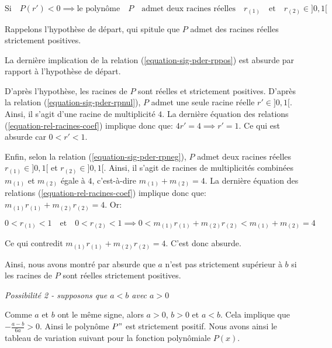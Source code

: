 \documentclass[12pt,a4paper,article]{memoir}
\begin{document}
\begin{equation}
\textrm{Si} \quad P(r') < 0 \implies \textrm{le polynôme} \quad P \quad \textrm{admet deux racines réelles} \quad r_{(1)} \quad \textrm{et} \quad r_{(2)} \in ]0,1[
\label{equation-sig-pder-rpneg}
\end{equation}

Rappelons l'hypothèse de départ, qui spitule que $P$ admet des racines réelles strictement positives. 

\bigskip

La dernière implication de la relation (\ref{equation-sig-pder-rppos}) est absurde par rapport à l'hypothèse de départ.

\bigskip

D'après l'hypothèse, les racines de $P$ sont réelles et strictement positives. D'après la relation (\ref{equation-sig-pder-rpnul}), $P$ admet une seule racine réelle $r' \in ]0,1[$. Ainsi, il s'agit d'une racine de multiplicité $4$. La dernière équation des relations (\ref{equation-rel-racines-coef}) implique donc que: $4r'=4 \implies r'=1$. Ce qui est absurde car  $0 < r' < 1$.

\bigskip

Enfin, selon la relation (\ref{equation-sig-pder-rpneg}), $P$ admet deux racines réelles $r_{(1)} \in ]0,1[$ et $r_{(2)} \in ]0,1[$. Ainsi, il s'agit de racines de multiplicités combinées $m_{(1)}$ et $m_{(2)}$ égale à $4$, c'est-à-dire $m_{(1)} + m_{(2)} = 4$. La dernière équation des relations (\ref{equation-rel-racines-coef}) implique donc que: $m_{(1)}r_{(1)} + m_{(2)}r_{(2)} =4$. Or:

\[0 < r_{(1)} < 1 \quad \textrm{et} \quad 0 < r_{(2)} < 1 \implies 0 < m_{(1)}r_{(1)} + m_{(2)}r_{(2)} < m_{(1)} + m_{(2)} = 4 \]

Ce qui contredit  $m_{(1)}r_{(1)} + m_{(2)}r_{(2)} =4$. C'est donc absurde.

\bigskip

Ainsi, nous avons montré par absurde que $a$ n'est pas strictement supérieur à $b$ si les racines de $P$ sont réelles strictement positives.

\bigskip

\textit{Possibilité 2 - supposons que $a < b$ avec $a > 0$}

\bigskip

Comme $a$ et $b$ ont le même signe, alors $a > 0$, $b > 0$ et $a < b$. Cela implique que $-\frac{a-b}{6a} > 0$. Ainsi le polynôme $P"$ est strictement positif. Nous avons ainsi le tableau de variation suivant pour la fonction polynômiale $P(x)$.
\end{document}
